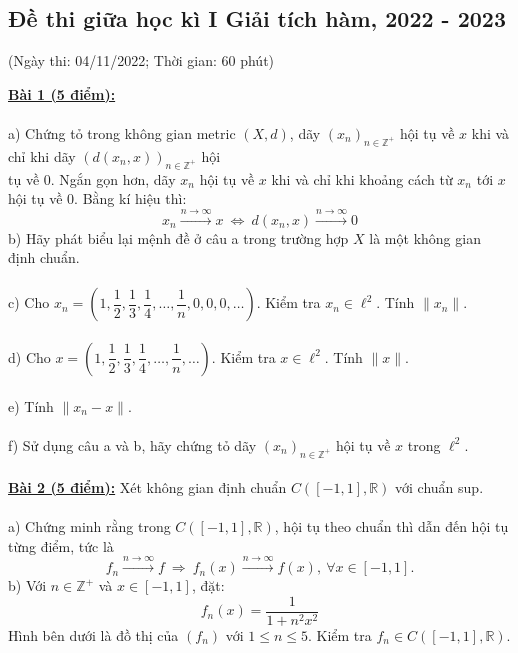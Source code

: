 \documentclass[10pt, a4paper]{article}
\begin{document}
\subsection{Đề thi giữa học kì I Giải tích hàm, 2022 - 2023}
\begin{center}
	\color{blue}(Ngày thi: 04/11/2022; Thời gian: 60 phút)
\end{center}
\color{red}\underline{\textbf{Bài 1 (5 điểm):}}\\\\
a) \color{black}Chứng tỏ trong không gian metric $(X,d)$, dãy $(x_n)_{n\in\mathbb Z^+}$ hội tụ về $x$ khi và chỉ khi dãy $(d(x_n,x))_{n\in\mathbb Z^+}$ hội\\ tụ về 0. Ngắn gọn hơn, dãy $x_n$ hội tụ về $x$ khi và chỉ khi khoảng cách từ $x_n$ tới $x$ hội tụ về 0. Bằng kí hiệu thì: $$x_n\xrightarrow{n\rightarrow\infty}x~\Longleftrightarrow~ d(x_n,x)\xrightarrow{n\rightarrow\infty}0$$
\color{red}b) \color{black}Hãy phát biểu lại mệnh đề ở câu a trong trường hợp $X$ là một không gian định chuẩn.\\\\
\color{red}c) \color{black}Cho $x_n=\left(1,\dfrac12,\dfrac13,\dfrac14,\dots,\dfrac1n,0,0,0,\dots\right)$. Kiểm tra $x_n\in\ell^2$. Tính $\lVert x_n\rVert$.\\\\
\color{red}d) \color{black}Cho $x=\left(1,\dfrac12,\dfrac13,\dfrac14,\dots,\dfrac1n,\dots\right)$. Kiểm tra $x\in\ell^2$. Tính $\lVert x\rVert$.\\\\
\color{red}e) \color{black}Tính $\lVert x_n-x\rVert$.\\\\
\color{red}f) \color{black}Sử dụng câu a và b, hãy chứng tỏ dãy $(x_n)_{n\in\mathbb Z^+}$ hội tụ về $x$ trong $\ell^2$.\\\\
\color{red}\underline{\textbf{Bài 2 (5 điểm):}} \color{black}Xét không gian định chuẩn $C([-1,1],\mathbb R)$ với chuẩn sup.\\\\
\color{red}a) \color{black}Chứng minh rằng trong $C([-1,1],\mathbb R)$, hội tụ theo chuẩn thì dẫn đến hội tụ từng điểm, tức là $$f_n\xrightarrow{n\rightarrow\infty}f~\Longrightarrow~f_n(x)\xrightarrow{n\rightarrow\infty}f(x),~\forall x\in[-1,1].$$
\color{red}b) \color{black}Với $n\in\mathbb Z^+$ và $x\in[-1,1]$, đặt: $$f_n(x)=\dfrac{1}{1+n^2x^2}$$ Hình bên dưới là đồ thị của $(f_n)$ với $1\le n\le5$. Kiểm tra $f_n\in C([-1,1],\mathbb R)$.\\\\
\end{document}
